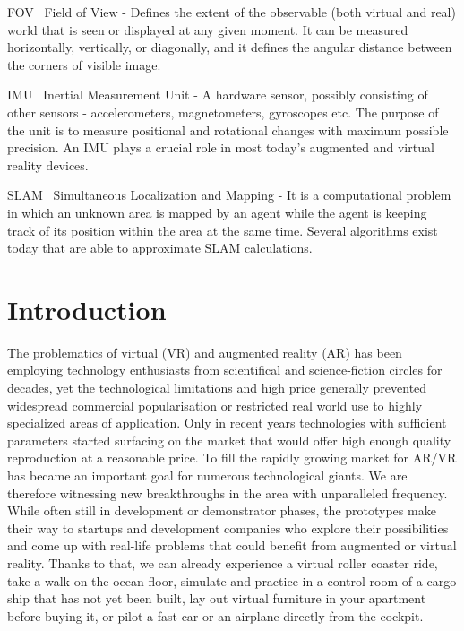 \documentclass[12pt, a4paper]{article}
\newenvironment{definitions}
{\begin{description}[style=nextline]}
{\end{description}}
\begin{document}
\begin{definitions}
	\item[FOV~] Field of View - Defines the extent of the observable (both virtual and real) world that is seen or displayed at any given moment. It can be measured horizontally, vertically, or diagonally, and it defines the angular distance between the corners of visible image.
	\item[IMU~] Inertial Measurement Unit - A hardware sensor, possibly consisting of other sensors - accelerometers, magnetometers, gyroscopes etc. The purpose of the unit is to measure positional and rotational changes with maximum possible precision. An IMU plays a crucial role in most today’s augmented and virtual reality devices.
	\item[SLAM~] Simultaneous Localization and Mapping - It is a computational problem in which an unknown area is mapped by an agent while the agent is keeping track of its position within the area at the same time. Several algorithms exist today that are able to approximate SLAM calculations.

\end{definitions}

\section{Introduction}
The problematics of virtual (VR) and augmented reality (AR) has been employing technology enthusiasts from scientifical and science-fiction circles for decades, yet the technological limitations and high price generally prevented widespread commercial popularisation or restricted real world use to highly specialized areas of application. Only in recent years technologies with sufficient parameters started surfacing on the market that would offer high enough quality reproduction at a reasonable price. To fill the rapidly growing market for AR/VR has became an important goal for numerous technological giants. We are therefore witnessing new breakthroughs in the area with unparalleled frequency. While often still in development or demonstrator phases, the prototypes make their way to startups and development companies who explore their possibilities and come up with real-life problems that could benefit from augmented or virtual reality. Thanks to that, we can already experience a virtual roller coaster ride, take a walk on the ocean floor, simulate and practice in a control room of a cargo ship that has not yet been built, lay out virtual furniture in your apartment before buying it, or pilot a fast car or an airplane directly from the cockpit.
\end{document}
